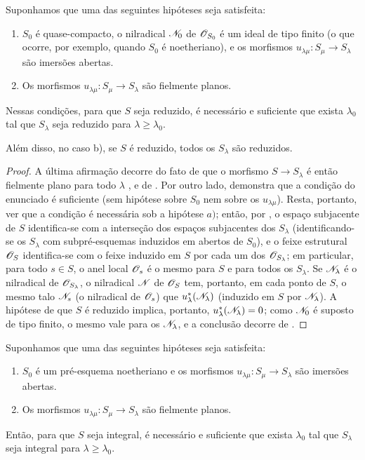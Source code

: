 \begin{proposition}[8.7.2]
\label{IV.8.7.2}
Suponhamos que uma das seguintes hipóteses seja satisfeita:
\begin{enumerate}[label=\emph{\alph*)}]
\item $S_0$ é quase-compacto, o nilradical $\mathscr{N}_0$ de $\mathscr{O}_{S_0}$ é um ideal de tipo finito (o que ocorre, por exemplo, quando $S_0$ é noetheriano), e os morfismos $u_{\lambda\mu}:S_\mu\to S_\lambda$ são imersões abertas.
\item Os morfismos $u_{\lambda\mu}:S_\mu\to S_\lambda$ são fielmente planos.
\end{enumerate}
Nessas condições, para que $S$ seja reduzido, é necessário e suficiente que exista $\lambda_0$ tal que $S_\lambda$ seja reduzido para $\lambda\geqslant\lambda_0$.

Além disso, no caso b), se $S$ é reduzido, todos os $S_\lambda$ são reduzidos.
\end{proposition}

\begin{proof}
A última afirmação decorre do fato de que o morfismo $S\to S_\lambda$ é então fielmente plano para todo $\lambda$ , e de .
Por outro lado,  demonstra que a condição do enunciado é suficiente (sem hipótese sobre $S_0$ nem sobre os $u_{\lambda\mu}$).
Resta, portanto, ver que a condição é necessária sob a hipótese $a)$; então, por , o espaço subjacente de $S$ identifica-se com a interseção dos espaços subjacentes dos $S_\lambda$ (identificando-se os $S_\lambda$ com subpré-esquemas induzidos em abertos de $S_0$), e o feixe estrutural $\mathscr{O}_S$ identifica-se com
o feixe induzido em $S$ por cada um dos $\mathscr{O}_{S_\lambda}$; em particular, para todo $s\in S$, o anel local $\mathscr{O}_s$ é o mesmo para $S$ e para todos os $S_\lambda$.
Se $\mathscr{N}_\lambda$ é o nilradical de $\mathscr{O}_{S_\lambda}$, o nilradical $\mathscr{N}$ de $\mathscr{O}_S$ tem, portanto, em cada ponto de $S$, o mesmo talo $\mathscr{N}_s$ (o nilradical de $\mathscr{O}_s$) que $u_\lambda^*(\mathscr{N}_\lambda)$ (induzido em $S$ por $\mathscr{N}_\lambda$).
A hipótese de que $S$ é reduzido implica, portanto, $u_\lambda^*(\mathscr{N}_\lambda)=0$; como $\mathscr{N}_0$ é suposto de tipo finito, o mesmo vale para os $\mathscr{N}_\lambda$, e a conclusão decorre de .
\end{proof}

\begin{corollary}[8.7.3]
\label{IV.8.7.3}
Suponhamos que uma das seguintes hipóteses seja satisfeita:
\begin{enumerate}[label=\emph{\alph*)}]
\item $S_0$ é um pré-esquema noetheriano e os morfismos $u_{\lambda\mu}:S_\mu\to S_\lambda$ são imersões abertas.
\item Os morfismos $u_{\lambda\mu}:S_\mu\to S_\lambda$ são fielmente planos.
\end{enumerate}
Então, para que $S$ seja integral, é necessário e suficiente que exista $\lambda_0$ tal que $S_\lambda$ seja integral para $\lambda\geqslant\lambda_0$.
\end{corollary}

